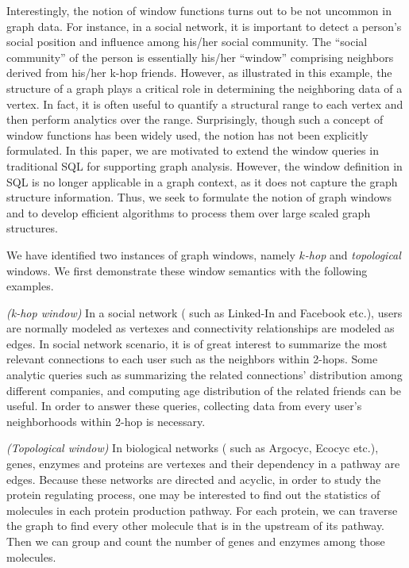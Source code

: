 Interestingly, the notion of window functions turns out to be not uncommon
in graph data. For instance, in a social network, it is important to detect 
a person's social position and influence among his/her social community. 
The ``social community'' of the person is essentially his/her ``window'' 
comprising neighbors derived from his/her k-hop friends.
However, as illustrated in this example, the structure of a graph
plays a critical role in determining the neighboring data of a vertex.
In fact, it is often useful to quantify a structural range to each vertex 
and then perform analytics over the range. 
Surprisingly, though such a concept of window functions has been widely
used, the notion has not been explicitly formulated. 
In this paper, we are motivated to extend the window queries in traditional 
SQL for supporting graph analysis. However, the window definition in 
SQL is no longer applicable in a graph context, as it does not capture 
the graph structure information.
Thus, we seek to formulate the notion of graph windows and to develop
efficient algorithms to process them over large scaled graph structures. 

We have identified two instances of graph windows, namely 
$k${\em -hop} and {\em topological} windows. 
We first demonstrate these window semantics with the following examples. 
\begin{example}
\label{query:linkedin-2-hop-window}
\emph{(k-hop window)} In a social network ( such as Linked-In and Facebook etc.), users are normally modeled as vertexes and connectivity relationships are modeled as edges. In social network scenario, it is of great interest to summarize the most relevant connections to each user such as the neighbors within 2-hops. Some analytic queries such as summarizing the related connections' distribution among different companies, and computing age distribution of the related friends can be useful. In order to answer these queries, collecting data from every user's neighborhoods within 2-hop is necessary.
\end{example}

\begin{example}
\label{query:bio-dag-window}
\emph{(Topological window)} In biological networks ( such as Argocyc, Ecocyc etc.\cite{keseler2005ecocyc}), genes, enzymes and proteins are vertexes and their dependency in a pathway are edges. Because these networks are directed 
and acyclic, in order to study the protein regulating process, one may be 
interested to find out the statistics of molecules in each protein 
production pathway. For each protein, we can traverse the graph to find 
every other molecule that is in the upstream of its pathway. Then we can group and count the number of genes and enzymes among those molecules. 
\end{example}

